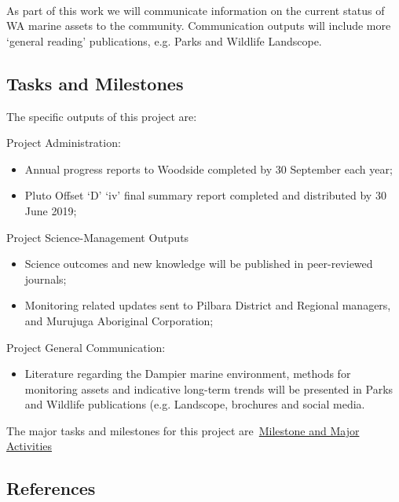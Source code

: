 \documentclass[version=last,
    paper=a4,                               %
    10pt,                                   %
    dvipsnames,
    oneside,                              %
    headings=openany,                       %
    open=any,
    BCOR=7mm,                               %
    DIV=15,     %
]{scrbook}
\providecommand{\tightlist}{\setlength{\itemsep}{0pt}\setlength{\parskip}{0pt}}
\begin{document}
~

As part of this work we will communicate information on the current
status of WA marine assets to the community. Communication outputs will
include more `general reading' publications, e.g. Parks and Wildlife
Landscope.




\subsection*{Tasks and Milestones}

The specific outputs of this project are:

Project Administration:

\begin{itemize}
\tightlist
\item
  Annual progress reports to Woodside completed by 30 September each
  year;
\item
  Pluto Offset `D' `iv' final summary report completed and distributed
  by 30 June 2019;
\end{itemize}

Project Science-Management Outputs

\begin{itemize}
\tightlist
\item
  Science outcomes and new knowledge will be published in peer-reviewed
  journals;
\item
  Monitoring related updates sent to Pilbara District and Regional
  managers, and Murujuga Aboriginal Corporation;
\end{itemize}

Project General Communication:

\begin{itemize}
\tightlist
\item
  Literature regarding the Dampier marine environment, methods for
  monitoring assets and indicative long-term trends will be presented in
  Parks and Wildlife publications (e.g. Landscope, brochures and social
  media.
\end{itemize}

\textenglish[variant=american]{The major tasks and milestones for this
project
are~\href{http://internal-data.dpaw.wa.gov.au/dataset/4afb0762-81ee-4d29-aa12-2728f725d85d/resource/61b24cf4-4800-44a8-aa21-5f92762f51d0/download/milestones-pdf.pdf}{Milestone
and Major Activities}}




\subsection*{References}
\end{document}
